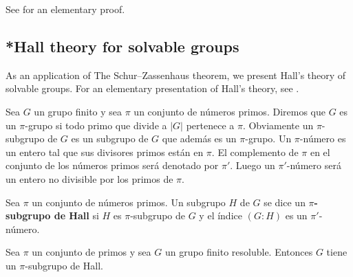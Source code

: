 See \cite{MR294497} for an elementary proof. 

\subsection{*Hall theory for solvable groups}

As an application of The Schur--Zassenhaus theorem, we present Hall's theory of solvable groups. For an elementary presentation of Hall's theory, see \cite{MR600654}. 

\begin{definition}
Sea $G$ un grupo finito y sea $\pi$ un conjunto de números primos. Diremos que
$G$ es un $\pi$-grupo si todo primo que divide a $|G|$ pertenece a $\pi$.
Obviamente un $\pi$-subgrupo de $G$ es un subgrupo de $G$ que además es un
$\pi$-grupo. Un $\pi$-número es un entero tal que sus divisores primos están en
$\pi$. El complemento de $\pi$ en el conjunto de los números primos será
denotado por $\pi'$. Luego un $\pi'$-número será un entero no divisible por los
primos de $\pi$.
\end{definition}

\begin{definition}
	Sea $\pi$ un conjunto de números primos. Un subgrupo $H$ de $G$ se dice un
	\textbf{$\pi$-subgrupo de Hall} si $H$ es $\pi$-subgrupo de $G$ y el índice $(G:H)$
	es un $\pi'$-número.
\end{definition}

\begin{theorem}[Hall]
	\label{theorem:HallE}
	Sea $\pi$ un conjunto de primos y sea $G$ un grupo finito resoluble. Entonces
	$G$ tiene un $\pi$-subgrupo de Hall.
\end{theorem}

